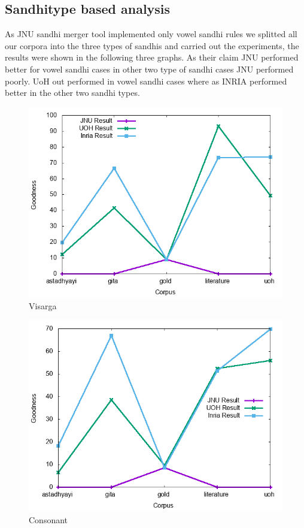 \documentclass[11pt]{article}
\begin{document}
\subsection{Sandhitype based analysis}
As JNU sandhi merger tool implemented only vowel sandhi rules we splitted all our corpora into the three types of sandhis and carried out the experiments, the results were shown in the following three graphs. As their claim JNU performed better for vowel sandhi cases in other two type of sandhi cases JNU performed poorly.  UoH out performed in vowel sandhi cases where as INRIA performed better in the other two sandhi types.
\begin{figure}[h]
	\center
	\includegraphics[scale=0.34]{images/visarga.png}
	\caption{\label{screen}Visarga}
\end{figure}

\begin{figure}[h]
	\center
	\includegraphics[scale=0.34]{images/consonant.png}
	\caption{\label{screen}Consonant}
\end{figure}
\end{document}
